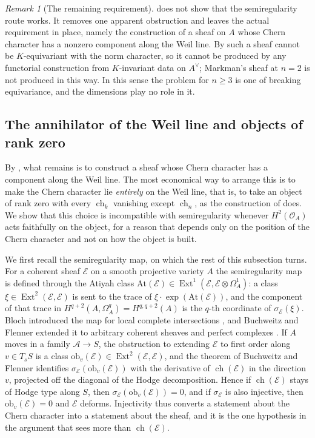 \documentclass[11pt,reqno]{amsart}
\theoremstyle{plain}
\theoremstyle{definition}
\theoremstyle{remark}
\newtheorem{remark}[theorem]{Remark}
\newcommand{\Av}{A^{\vee}}
\newcommand{\cE}{\mathcal{E}}
\newcommand{\cO}{\mathcal{O}}
\newcommand{\cA}{\mathcal{A}}
\DeclareMathOperator{\ch}{ch}
\DeclareMathOperator{\Ext}{Ext}
\begin{document}
\begin{remark}[The remaining requirement]\label{rem:semiregneed}
 does not show that the semiregularity route works.
It removes one apparent obstruction and leaves the actual requirement in
place, namely the construction of a sheaf on $A$ whose Chern character has a
nonzero component along the Weil line. By  such a sheaf
cannot be $K$-equivariant with the norm character, so it cannot be produced
by any functorial construction from $K$-invariant data on $\Av$; Markman's
sheaf at $n=2$ is not produced in this way. In this sense the problem for
$n\ge3$ is one of breaking equivariance, and the dimensions play no role in
it.
\end{remark}

\subsection{The annihilator of the Weil line and objects of rank zero}
\label{ssec:rankzero}

By , what remains is to construct a sheaf whose Chern
character has a component along the Weil line. The most economical way to
arrange this is to make the Chern character lie \emph{entirely} on the Weil
line, that is, to take an object of rank zero with every $\ch_{k}$ vanishing
except $\ch_{n}$, as the construction of  does. We show
that this choice is incompatible with semiregularity whenever $H^{2}(\cO_{A})$
acts faithfully on the object, for a reason that depends only on the position
of the Chern character and not on how the object is built.

We first recall the semiregularity map, on which the rest of this subsection
turns. For a coherent sheaf $\cE$ on a smooth projective variety $A$ the semiregularity
map is defined through the Atiyah class
$\mathrm{At}(\cE)\in\Ext^{1}(\cE,\cE\otimes\Omega^{1}_{A})$: a class
$\xi\in\Ext^{2}(\cE,\cE)$ is sent to the trace of
$\xi\cdot\exp(\mathrm{At}(\cE))$, and the component of that trace in
$H^{q+2}(A,\Omega^{q}_{A})=H^{q,q+2}(A)$ is the $q$-th coordinate of
$\sigma_{\cE}(\xi)$. Bloch introduced the map for local complete
intersections \cite{Blo72}, and Buchweitz and Flenner extended it to
arbitrary coherent sheaves and perfect complexes \cite{BF03}. If $A$ moves in
a family $\cA\to S$, the obstruction to extending $\cE$ to first order along
$v\in T_{s}S$ is a class $\mathrm{ob}_{v}(\cE)\in\Ext^{2}(\cE,\cE)$, and the
theorem of Buchweitz and Flenner identifies $\sigma_{\cE}(\mathrm{ob}_{v}(\cE))$
with the derivative of $\ch(\cE)$ in the direction $v$, projected off the
diagonal of the Hodge decomposition. Hence if $\ch(\cE)$ stays of Hodge type
along $S$, then $\sigma_{\cE}(\mathrm{ob}_{v}(\cE))=0$, and if $\sigma_{\cE}$ is
also injective, then $\mathrm{ob}_{v}(\cE)=0$ and $\cE$ deforms.
Injectivity thus converts a statement about the Chern character into a
statement about the sheaf, and it is the one hypothesis in the argument that
sees more than $\ch(\cE)$.
\end{document}
